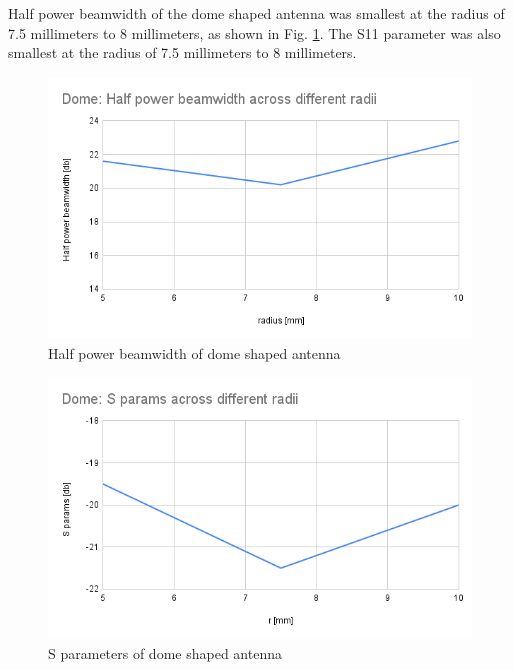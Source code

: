 \documentclass[a4paper,12pt]{report}
\begin{document}
Half power beamwidth of the dome shaped antenna
was smallest at the radius of 7.5 millimeters to 8 millimeters,
as shown in Fig. \ref{fig:dome_half_power_beamwidth_across_different_radii}.
The S11 parameter was also smallest at the radius of 7.5 millimeters to 8 millimeters.

\begin{figure}
  \begin{center}
    \includegraphics[clip, keepaspectratio, width=0.9\linewidth]{img/dome_half_power_beamwidth_across_different_radii.png}
    \caption{Half power beamwidth of dome shaped antenna}
    \label{fig:dome_half_power_beamwidth_across_different_radii} 
  \end{center}
\end{figure}

\begin{figure}
  \begin{center}
    \includegraphics[clip, keepaspectratio, width=0.9\linewidth]{img/dome_s_params_across_different_radii.png}
    \caption{S parameters of dome shaped antenna}
    \label{fig:dome_s_params_across_different_radii} 
  \end{center}
\end{figure}
\end{document}
